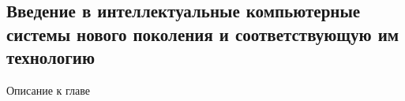 
\begin{partbacktext}
\part{Введение в интеллектуальные компьютерные системы нового поколения и соответствующую им технологию}
\noindent Описание к главе
\end{partbacktext}